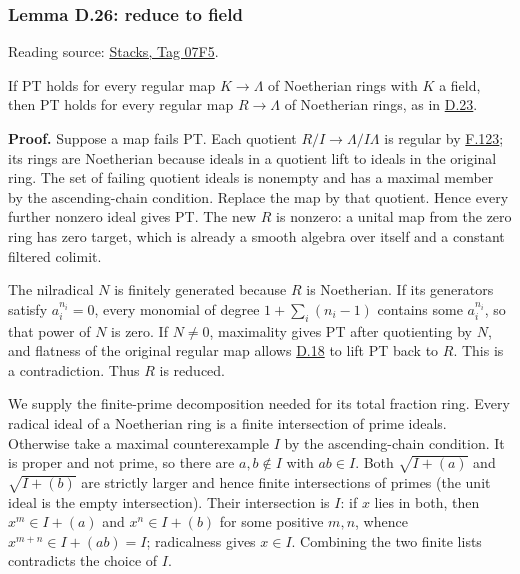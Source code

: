 \documentclass[11pt,a4paper,openany]{report}
\newcounter{none}
\begin{document}
\label{AG-RG-S05-smoothing-lemma-reduce-to-field}

\subsubsection{Lemma D.26: reduce to field}\label{AG-RG-S05-lemma-d.26-reduce-to-field}

Reading source: \href{https://stacks.math.columbia.edu/tag/07F5}{Stacks, Tag 07F5}.

If PT holds for every regular map \(K\to\Lambda\) of Noetherian rings with \(K\) a field, then PT holds for every regular map \(R\to\Lambda\) of Noetherian rings, as in \hyperref[AG-RG-S05-smoothing-situation-global]{D.23}.

\textbf{Proof.} Suppose a map fails PT. Each quotient \(R/I\to\Lambda/I\Lambda\) is regular by \hyperref[AG-RG-S05-more-algebra-lemma-regular-base-change]{F.123}; its rings are Noetherian because ideals in a quotient lift to ideals in the original ring. The set of failing quotient ideals is nonempty and has a maximal member by the ascending-chain condition. Replace the map by that quotient. Hence every further nonzero ideal gives PT. The new \(R\) is nonzero: a unital map from the zero ring has zero target, which is already a smooth algebra over itself and a constant filtered colimit.

The nilradical \(N\) is finitely generated because \(R\) is Noetherian. If its generators satisfy \(a_i^{n_i}=0\), every monomial of degree \(1+\sum_i(n_i-1)\) contains some \(a_i^{n_i}\), so that power of \(N\) is zero. If \(N\ne0\), maximality gives PT after quotienting by \(N\), and flatness of the original regular map allows \hyperref[AG-RG-S05-smoothing-proposition-lift]{D.18} to lift PT back to \(R\). This is a contradiction. Thus \(R\) is reduced.

We supply the finite-prime decomposition needed for its total fraction ring. Every radical ideal of a Noetherian ring is a finite intersection of prime ideals. Otherwise take a maximal counterexample \(I\) by the ascending-chain condition. It is proper and not prime, so there are \(a,b\notin I\) with \(ab\in I\). Both \(\sqrt{I+(a)}\) and \(\sqrt{I+(b)}\) are strictly larger and hence finite intersections of primes (the unit ideal is the empty intersection). Their intersection is \(I\): if \(x\) lies in both, then \(x^m\in I+(a)\) and \(x^n\in I+(b)\) for some positive \(m,n\), whence \(x^{m+n}\in I+(ab)=I\); radicalness gives \(x\in I\). Combining the two finite lists contradicts the choice of \(I\).
\end{document}
